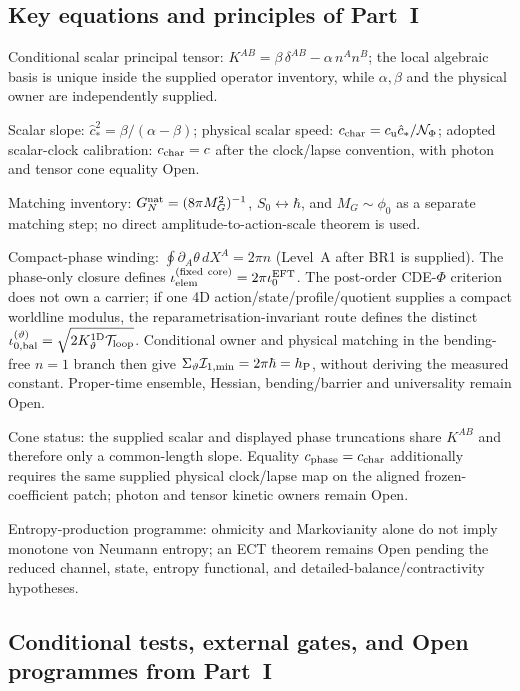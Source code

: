 \documentclass[11pt,a4paper]{article}
\begin{document}
\subsection{Key equations and principles of Part~I}

Conditional scalar principal tensor: $K^{AB} = \beta\,\delta^{AB} - \alpha\,n^An^B$; the local algebraic basis is unique inside the supplied operator inventory, while $\alpha,\beta$ and the physical owner are independently supplied.

Scalar slope: $\hat c_*^2=\beta/(\alpha-\beta)$; physical scalar speed: $c_{\rm char}=c_{\rm u}\hat c_*/\mathcal N_\Phi$; adopted scalar-clock calibration: $c_{\rm char}=c$ after the clock/lapse convention, with photon and tensor cone equality Open.

Matching inventory: $G_N^{\rm nat}=(8\pi M_G^2)^{-1}$, $S_0\leftrightarrow\hbar$, and $M_G\sim\phi_0$ as a separate matching step; no direct amplitude-to-action-scale theorem is used.

Compact-phase winding: $\oint \partial_A\theta\,dX^A=2\pi n$ (Level~A after BR1 is supplied).  The phase-only closure defines $\iota_{\rm elem}^{\rm(fixed\ core)}=2\pi \iota_0^{\rm EFT}$.  The post-order CDE-$\Phi$ criterion does not own a carrier; if one 4D action/state/profile/quotient supplies a compact worldline modulus, the reparametrisation-invariant route defines the distinct $\iota_{0,\rm bal}^{(\vartheta)}=\sqrt{2K_\vartheta^{1\mathrm D}\mathcal T_{\rm loop}}$.  Conditional owner and physical matching in the bending-free $n=1$ branch then give $\Sigma_\vartheta\mathcal I_{1,\min}=2\pi\hbar=h_{\rm P}$, without deriving the measured constant.  Proper-time ensemble, Hessian, bending/barrier and universality remain Open.

Cone status: the supplied scalar and displayed phase truncations share $K^{AB}$ and therefore only a common-length slope.  Equality $c_{\rm phase}=c_{\rm char}$ additionally requires the same supplied physical clock/lapse map on the aligned frozen-coefficient patch; photon and tensor kinetic owners remain Open.

Entropy-production programme: ohmicity and Markovianity alone do not imply monotone von Neumann entropy; an ECT theorem remains Open pending the reduced channel, state, entropy functional, and detailed-balance/contractivity hypotheses.

\subsection{Conditional tests, external gates, and Open programmes from Part~I}
\end{document}
